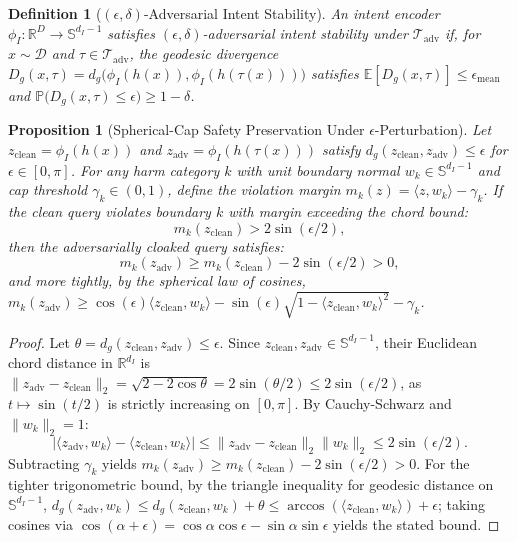 \documentclass[11pt,twocolumn,a4paper]{article}
\newtheorem{definition}{Definition}
\newtheorem{proposition}{Proposition}
\begin{document}
\begin{definition}[$(\epsilon, \delta)$-Adversarial Intent Stability]
\label{def:invariance}
An intent encoder $\phi_I: \mathbb{R}^D \to \mathbb{S}^{d_I-1}$ satisfies $(\epsilon, \delta)$-adversarial intent stability under $\mathcal{T}_{\text{adv}}$ if, for $x \sim \mathcal{D}$ and $\tau \in \mathcal{T}_{\text{adv}}$, the geodesic divergence $D_g(x, \tau) = d_g\big(\phi_I(h(x)), \phi_I(h(\tau(x)))\big)$ satisfies $\mathbb{E}[D_g(x, \tau)] \le \epsilon_{\text{mean}}$ and $\mathbb{P}\big(D_g(x, \tau) \le \epsilon\big) \ge 1 - \delta$.
\end{definition}

\begin{proposition}[Spherical-Cap Safety Preservation Under $\epsilon$-Perturbation]
\label{prop:invariance}
Let $z_{\text{clean}} = \phi_I(h(x))$ and $z_{\text{adv}} = \phi_I(h(\tau(x)))$ satisfy $d_g(z_{\text{clean}}, z_{\text{adv}}) \le \epsilon$ for $\epsilon \in [0, \pi]$. For any harm category $k$ with unit boundary normal $w_k \in \mathbb{S}^{d_I-1}$ and cap threshold $\gamma_k \in (0, 1)$, define the violation margin $m_k(z) = \langle z, w_k \rangle - \gamma_k$. If the clean query violates boundary $k$ with margin exceeding the chord bound:
\begin{equation}
    m_k(z_{\text{clean}}) > 2\sin(\epsilon / 2),
\end{equation}
then the adversarially cloaked query satisfies:
\begin{equation}
    m_k(z_{\text{adv}}) \ge m_k(z_{\text{clean}}) - 2\sin(\epsilon / 2) > 0,
\end{equation}
and more tightly, by the spherical law of cosines, $m_k(z_{\text{adv}}) \ge \cos(\epsilon)\langle z_{\text{clean}}, w_k \rangle - \sin(\epsilon)\sqrt{1 - \langle z_{\text{clean}}, w_k \rangle^2} - \gamma_k$.
\end{proposition}
\begin{proof}
Let $\theta = d_g(z_{\text{clean}}, z_{\text{adv}}) \le \epsilon$. Since $z_{\text{clean}}, z_{\text{adv}} \in \mathbb{S}^{d_I-1}$, their Euclidean chord distance in $\mathbb{R}^{d_I}$ is $\|z_{\text{adv}} - z_{\text{clean}}\|_2 = \sqrt{2 - 2\cos\theta} = 2\sin(\theta/2) \le 2\sin(\epsilon/2)$, as $t \mapsto \sin(t/2)$ is strictly increasing on $[0, \pi]$. By Cauchy-Schwarz and $\|w_k\|_2 = 1$:
\begin{equation*}
    \big|\langle z_{\text{adv}}, w_k \rangle - \langle z_{\text{clean}}, w_k \rangle\big| \le \|z_{\text{adv}} - z_{\text{clean}}\|_2 \|w_k\|_2 \le 2\sin(\epsilon/2).
\end{equation*}
Subtracting $\gamma_k$ yields $m_k(z_{\text{adv}}) \ge m_k(z_{\text{clean}}) - 2\sin(\epsilon/2) > 0$. For the tighter trigonometric bound, by the triangle inequality for geodesic distance on $\mathbb{S}^{d_I-1}$, $d_g(z_{\text{adv}}, w_k) \le d_g(z_{\text{clean}}, w_k) + \theta \le \arccos(\langle z_{\text{clean}}, w_k \rangle) + \epsilon$; taking cosines via $\cos(\alpha + \epsilon) = \cos\alpha\cos\epsilon - \sin\alpha\sin\epsilon$ yields the stated bound.
\end{proof}
\end{document}
